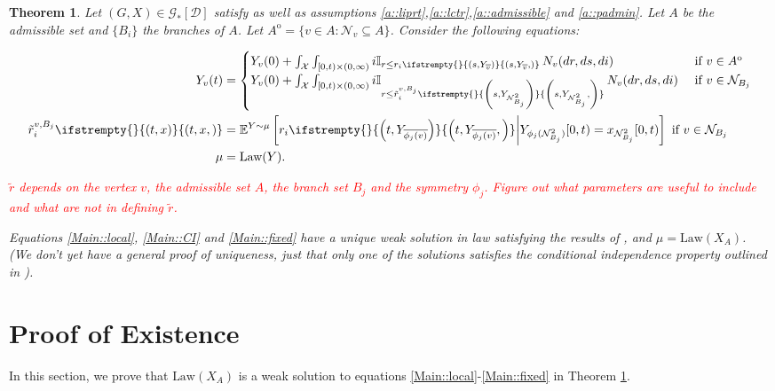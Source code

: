 \documentclass[12pt]{article}
\newcommand{\mb}{\mathbb}
\newcommand{\mc}{\mathcal}
\newcommand{\ov}{\overline}
\newcommand{\te}{\text}
\newcommand{\tr}{\textcolor{red}}
\newcommand{\ind}{\hspace{24pt}}
\newcommand{\exmu}[2]{\mb{E}^{#1}\left[#2\right]}	%
\newcommand{\cad}{\mc{D}}							%
\newcommand{\sta}{\mc{X}}							%
\newcommand{\neigh}[1]{\mc{N}_{#1}}				%
\newcommand{\dneigh}[1]{\mc{N}^2_{#1}}			%
\newcommand{\cl}[1]{\ov{#1}}						%
\newcommand{\Xf}{X}									%
\newcommand{\poiss}{N}								%
\newcommand{\rate}{r}								%
\newcommand{\xf}{x}									%
\newcommand{\poissv}[1]{_{#1}}						%
\newcommand{\vind}[1]{_{#1}}						%
\newcommand{\tme}[1]{(#1)}							%
\newcommand{\tmi}[1]{#1}							%
\newcommand{\stpara}[1]{_{#1}}						%
\newcommand{\Gs}{\mc{G}_\ast}						%
\newcommand{\tmepro}[3]{
\ifstrempty{#3}{
	\left(#1,#2\right)}{
	\left(#1,#2,#3\right)}}							%
\renewcommand{\sp}[1]{[#1]}							%
\newcommand{\Xg}{Y}									%
\newcommand{\brate}{\alt{\rate}}					%
\newcommand{\inte}[1]{{#1}^\mathrm{o}}				%
\newcommand{\alt}[1]{\tilde{#1}}					%
\newcommand{\law}{\te{Law}}							%
\newcommand{\vjpara}[2]{^{#1,#2}}					%
\newtheorem{thms}{Theorem}[section]
\begin{document}
\begin{thms}
Let \((G,\Xf) \in \Gs\sp{\cad}\) satisfy \cite[assumptions \ref{F-a::bddinit},\ref{F-a::bddr}, \ref{F-a::liprx}, \ref{F-CI::indinit}]{F} as well as assumptions \ref{a::liprt},\ref{a::lctr},\ref{a::admissible} and \ref{a::padmin}. Let \(A\) be the admissible set and \(\{B_i\}\) the branches of \(A\). Let \(\inte{A} = \{v \in A: \neigh{v} \subseteq A\}\). Consider the following equations:

\begin{align}
\Xg\vind{v}\tme{t} &= 
\begin{cases}
\Xg\vind{v}\tme{0} + \int_{\sta} \int_{[0,t)\times (0,\infty)} i\mb{I}_{r\leq \rate\stpara{i}\tmepro{s}{\Xg\vind{\cl{v}}}{}}\,\poiss\poissv{v}(dr,ds,di) & \te{ if } v \in \inte{A}\\
\Xg\vind{v}\tme{0} + \int_{\sta} \int_{[0,t)\times (0,\infty)} i\mb{I}_{r\leq \brate\vjpara{v}{B_j}\stpara{i}\tmepro{s}{\Xg\vind{\dneigh{B_j}}}{}}\,\poiss\poissv{v}(dr,ds,di) &\te{ if } v \in \neigh{B_j}
\end{cases}\label{Main::local}\\
\brate\vjpara{v}{B_j}\stpara{i}\tmepro{t}{\xf}{} &= \exmu{\Xg \sim \mu}{\rate\stpara{i}\tmepro{t}{\Xg\vind{\cl{\phi_j(v)}}}{}\middle|\Xg\vind{\phi_j(\dneigh{B_j})}\tmi{[0,t)} = x\vind{\dneigh{B_j}}\tmi{[0,t)}} \te{ if } v \in \neigh{B_j}\label{Main::CI}\\
\mu &= \law(\Xg).\label{Main::fixed}
\end{align}

\tr{\(\brate\) depends on the vertex \(v\), the admissible set \(A\), the branch set \(B_j\) and the symmetry \(\phi_j\). Figure out what parameters are useful to include and what are not in defining \(\brate\).}

\ind Equations \eqref{Main::local}, \eqref{Main::CI} and \eqref{Main::fixed} have a unique weak solution in law satisfying the results of \cite[theorem \ref{F-CI::CI}]{F}, and \(\mu = \law(\Xf\vind{A})\). (We don't yet have a general proof of uniqueness, just that only one of the solutions satisfies the conditional independence property outlined in \cite[section \ref{F-CI}]{F}).
\label{Main::Main}
\end{thms}

\section{Proof of Existence}
\label{Ex}

In this section, we prove that \(\law(\Xf\vind{A})\) is a weak solution to equations \eqref{Main::local}-\eqref{Main::fixed} in Theorem \ref{Main::Main}.
\end{document}
